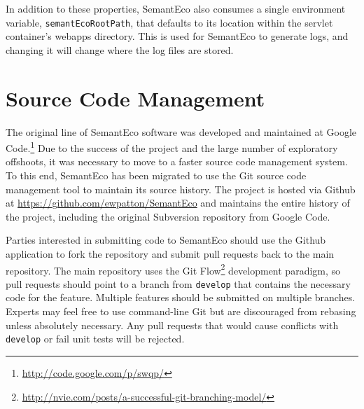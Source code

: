 \documentclass[letterpaper]{report}
\begin{document}
In addition to these properties, SemantEco also consumes a single environment variable, \texttt{semantEcoRootPath}, that defaults to its location within the servlet container's webapps directory. This is used for SemantEco to generate logs, and changing it will change where the log files are stored.

\chapter{Source Code Management}
The original line of SemantEco software was developed and maintained at Google Code.\footnote{\url{http://code.google.com/p/swqp/}} Due to the success of the project and the large number of exploratory offshoots, it was necessary to move to a faster source code management system. To this end, SemantEco has been migrated to use the Git source code management tool to maintain its source history. The project is hosted via Github at \url{https://github.com/ewpatton/SemantEco} and maintains the entire history of the project, including the original Subversion repository from Google Code.

Parties interested in submitting code to SemantEco should use the Github application to fork the repository and submit pull requests back to the main repository. The main repository uses the Git Flow\footnote{\url{http://nvie.com/posts/a-successful-git-branching-model/}} development paradigm, so pull requests should point to a branch from \texttt{develop} that contains the necessary code for the feature. Multiple features should be submitted on multiple branches. Experts may feel free to use command-line Git but are discouraged from rebasing unless absolutely necessary. Any pull requests that would cause conflicts with \texttt{develop} or fail unit tests will be rejected.

\renewcommand{\bibname}{References}


\end{document}
